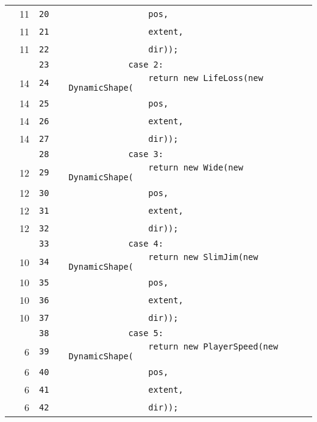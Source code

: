 \documentclass[a4paper,landscape,10pt]{article}
\begin{document}
\begin{longtable}[l]{lrrll}
\cellcolor{green} & 11 & \verb~20~ & & \verb~                pos,~\\
\cellcolor{green} & 11 & \verb~21~ & & \verb~                extent,~\\
\cellcolor{green} & 11 & \verb~22~ & & \verb~                dir));~\\
\cellcolor{gray} &  & \verb~23~ & & \verb~            case 2:~\\
\cellcolor{green} & 14 & \verb~24~ & & \verb~                return new LifeLoss(new DynamicShape(~\\
\cellcolor{green} & 14 & \verb~25~ & & \verb~                pos,~\\
\cellcolor{green} & 14 & \verb~26~ & & \verb~                extent,~\\
\cellcolor{green} & 14 & \verb~27~ & & \verb~                dir));~\\
\cellcolor{gray} &  & \verb~28~ & & \verb~            case 3:~\\
\cellcolor{green} & 12 & \verb~29~ & & \verb~                return new Wide(new DynamicShape(~\\
\cellcolor{green} & 12 & \verb~30~ & & \verb~                pos,~\\
\cellcolor{green} & 12 & \verb~31~ & & \verb~                extent,~\\
\cellcolor{green} & 12 & \verb~32~ & & \verb~                dir));~\\
\cellcolor{gray} &  & \verb~33~ & & \verb~            case 4:~\\
\cellcolor{green} & 10 & \verb~34~ & & \verb~                return new SlimJim(new DynamicShape(~\\
\cellcolor{green} & 10 & \verb~35~ & & \verb~                pos,~\\
\cellcolor{green} & 10 & \verb~36~ & & \verb~                extent,~\\
\cellcolor{green} & 10 & \verb~37~ & & \verb~                dir));~\\
\cellcolor{gray} &  & \verb~38~ & & \verb~            case 5:~\\
\cellcolor{green} & 6 & \verb~39~ & & \verb~                return new PlayerSpeed(new DynamicShape(~\\
\cellcolor{green} & 6 & \verb~40~ & & \verb~                pos,~\\
\cellcolor{green} & 6 & \verb~41~ & & \verb~                extent,~\\
\cellcolor{green} & 6 & \verb~42~ & & \verb~                dir));~\\

\end{longtable}
\end{document}
